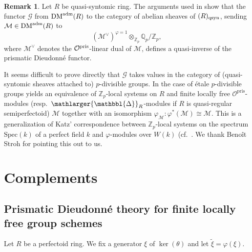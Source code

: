 \documentclass{amsart}
\newcommand{\prism}{{\mathlarger{\mathbbl{\Delta}}}}
\theoremstyle{plain}
\theoremstyle{definition}
\newtheorem{definition}[theorem]{Definition}
\newtheorem{remark}[theorem]{Remark}
\newcommand{\pris}{\mathrm{pris}}
\newcommand{\Spec}{\mathrm{Spec}}
\newcommand{\tilxi}{\tilde{\xi}}
\newcommand{\Z}{\mathbb{Z}}
\newcommand{\DM}{\mathrm{DM}}
\begin{document}
\begin{remark}
\label{writing-a-quasi-inverse}
Let $R$ be quasi-syntomic ring. The arguments used in  show that the functor $\mathcal{G}$ from $\mathrm{DM}^{\rm adm}(R)$ to the category of abelian sheaves of $(R)_{\rm qsyn}$, sending $\mathcal{M} \in \DM^{\rm adm}(R)$ to
 \[ (\mathcal{M}^{\vee})^{\varphi=1} \otimes_{\Z_p} \mathbb{Q}_p/\Z_p, \]
where $\mathcal{M}^{\vee}$ denotes the $\mathcal{O}^{\rm pris}$-linear dual of $\mathcal{M}$, defines a quasi-inverse of the prismatic Dieudonn\'e functor.

It seems difficult to prove directly that $\mathcal{G}$ takes values in the category of (quasi-syntomic sheaves attached to) $p$-divisible groups. In the case of \'etale $p$-divisible groups  yields an equivalence of $\Z_p$-local systems on $R$ and finite locally free $\mathcal{O}^\pris$-modules (resp.\ $\prism_R$-modules if $R$ is quasi-regular semiperfectoid) $\mathcal{M}$ together with an isomorphism $\varphi_{\mathcal{M}}\colon \varphi^\ast(\mathcal{M})\cong \mathcal{M}$. This is a generalization of Katz' correspondence between $\Z_p$-local systems on the spectrum $\Spec(k)$ of a perfect field $k$ and $\varphi$-modules over $W(k)$ (cf.\ \cite[Proposition 4.1.1]{katz_p_adic_properties_of_modular_schemes_and_modular_forms}.
We thank Beno\^it Stroh for pointing this out to us.
\end{remark}




\newpage
\section{Complements} \label{complements}

\subsection{Prismatic Dieudonn\'e theory for finite locally free group schemes} \label{sec:complements-finite-locally-free}

Let $R$ be a perfectoid ring. We fix a generator $\xi$ of $\ker(\theta)$ and let $\tilxi=\varphi(\xi)$. 

\end{document}
